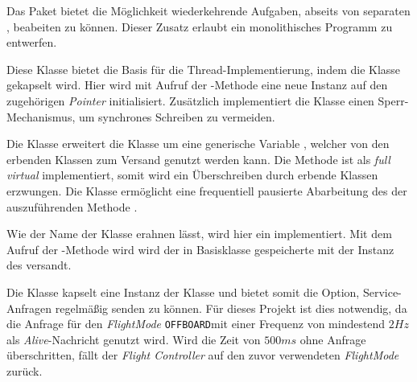 
Das Paket  bietet die Möglichkeit wiederkehrende Aufgaben, abseits von separaten \Node[s], beabeiten zu können. Dieser Zusatz erlaubt ein monolithisches Programm zu entwerfen.


Diese Klasse bietet die Basis für die Thread-Implementierung, indem die Klasse  gekapselt wird. Hier wird mit Aufruf der -Methode eine neue Instanz auf den zugehörigen \textit{Pointer} initialisiert. Zusätzlich implementiert die Klasse  einen Sperr-Mechanismus, um synchrones Schreiben zu vermeiden. 


Die Klasse  erweitert die Klasse  um eine generische Variable , welcher von den erbenden Klassen zum Versand genutzt werden kann. Die Methode  ist als \textit{full virtual} implementiert, somit wird ein Überschreiben durch erbende Klassen erzwungen. Die Klasse  ermöglicht eine frequentiell pausierte Abarbeitung des der auszuführenden Methode .



Wie der Name der Klasse  erahnen lässt, wird hier ein  implementiert. Mit dem Aufruf der -Methode wird wird der in Basisklasse  gespeicherte  mit der Instanz des  versandt.


Die Klasse  kapselt eine Instanz der Klasse  und bietet somit die Option, Service-Anfragen regelmäßig senden zu können.
Für dieses Projekt ist dies notwendig, da die Anfrage für den \textit{FlightMode} \glqq\texttt{OFFBOARD}\grqq mit einer Frequenz von mindestend $2 Hz$ als \textit{Alive}-Nachricht genutzt wird. Wird die Zeit von $500 ms$ ohne Anfrage überschritten, fällt der \textit{Flight Controller} auf den zuvor verwendeten \textit{FlightMode} zurück.